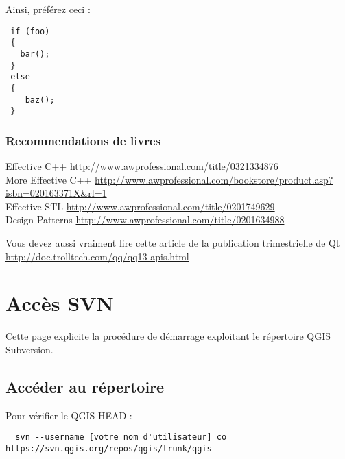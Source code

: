 Ainsi, préférez ceci :

\begin{verbatim}
 if (foo)
 {
   bar();
 }
 else
 { 
    baz();
 } 
\end{verbatim}

\subsubsection{Recommendations de livres}

Effective C++ \url{http://www.awprofessional.com/title/0321334876} \\
More Effective C++ \url{http://www.awprofessional.com/bookstore/product.asp?isbn=020163371X&rl=1} \\
Effective STL \url{http://www.awprofessional.com/title/0201749629} \\
Design Patterns \url{http://www.awprofessional.com/title/0201634988}

Vous devez aussi vraiment lire cette article de la publication trimestrielle de Qt \url{http://doc.trolltech.com/qq/qq13-apis.html}
\section{Accès SVN}
Cette page explicite la procédure de démarrage exploitant le répertoire QGIS Subversion.
\subsection{Accéder au répertoire}
Pour vérifier le QGIS HEAD :
\begin{verbatim}
  svn --username [votre nom d'utilisateur] co https://svn.qgis.org/repos/qgis/trunk/qgis
\end{verbatim}

